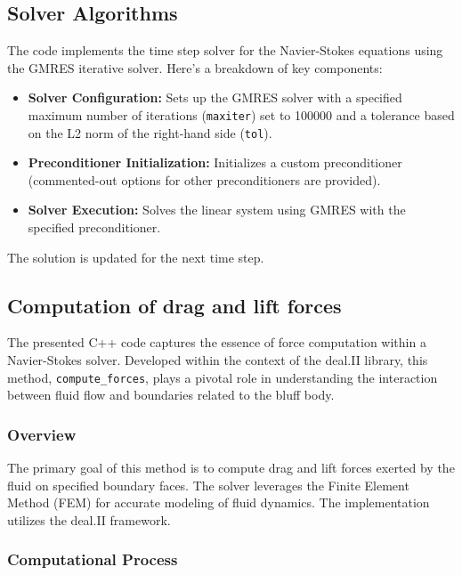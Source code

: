 \documentclass{article}
\begin{document}
\subsection{Solver Algorithms}

The code implements the time step solver for the Navier-Stokes equations using the GMRES iterative solver. Here's a breakdown of key components:

\begin{itemize}
  \item \textbf{Solver Configuration:} Sets up the GMRES solver with a specified maximum number of iterations (\texttt{maxiter}) set to 100000 and a tolerance based on the L2 norm of the right-hand side (\texttt{tol}).
  \item \textbf{Preconditioner Initialization:} Initializes a custom preconditioner (commented-out options for other preconditioners are provided).
  \item \textbf{Solver Execution:} Solves the linear system using GMRES with the specified preconditioner.
\end{itemize}

The solution is updated for the next time step.

\subsection{Computation of drag and lift forces}

The presented C++ code captures the essence of force computation within a Navier-Stokes solver. Developed within the context of the deal.II library, this method, \texttt{compute\_forces}, plays a pivotal role in understanding the interaction between fluid flow and boundaries related to the bluff body.

\subsubsection{Overview}

The primary goal of this method is to compute drag and lift forces exerted by the fluid on specified boundary faces. The solver leverages the Finite Element Method (FEM) for accurate modeling of fluid dynamics. The implementation utilizes the deal.II framework.

\subsubsection{Computational Process}
\end{document}
